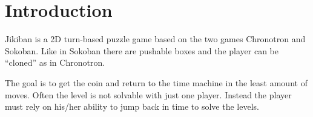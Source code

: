 \section{Introduction}
Jikiban is a 2D turn-based puzzle game based on the two games
Chronotron and Sokoban. Like in Sokoban there are pushable boxes and
the player can be ``cloned'' as in Chronotron.

The goal is to get the coin and return to the time machine in the
least amount of moves.  Often the level is not solvable with just one
player.  Instead the player must rely on his/her ability to jump back
in time to solve the levels.
